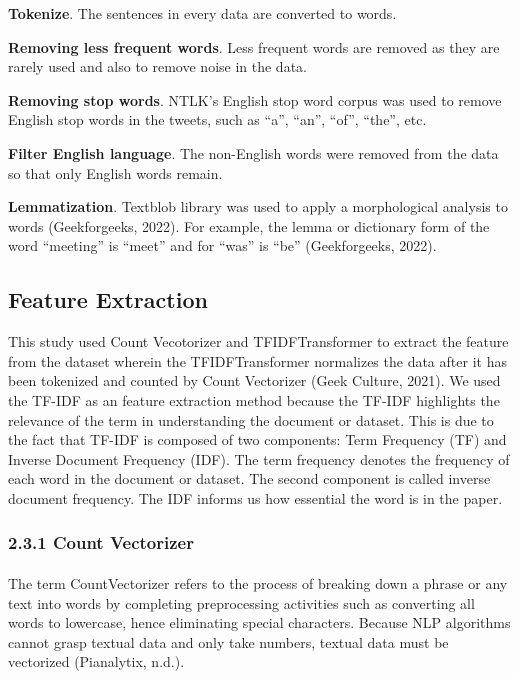 \documentclass[runningheads]{llncs}
\begin{document}
\textbf{Tokenize}. The sentences in every data are converted to words.

\textbf{Removing less frequent words}. Less frequent words are removed as they are rarely used and also to remove noise in the data.

\textbf{Removing stop words}. NTLK’s English stop word corpus was used to remove English stop words in the tweets, such as “a”, “an”, “of”, “the”, etc.

\textbf{Filter English language}. The non-English words were removed from the data so that only English words remain.

\textbf{Lemmatization}. Textblob library was used to apply a morphological analysis to words (Geekforgeeks, 2022). For example, the lemma or dictionary form of the word “meeting” is “meet” and for “was” is “be” (Geekforgeeks, 2022).

\subsection{Feature Extraction}
This study used Count Vecotorizer and TFIDFTransformer to extract the feature from the dataset wherein the TFIDFTransformer normalizes the data after it has been tokenized and counted by Count Vectorizer (Geek Culture, 2021). We used the TF-IDF as an feature extraction method because the TF-IDF highlights the relevance of the term in understanding the document or dataset. This is due to the fact that TF-IDF is composed of two components: Term Frequency (TF) and Inverse Document Frequency (IDF). The term frequency denotes the frequency of each word in the document or dataset. The second component is called inverse document frequency. The IDF informs us how essential the word is in the paper.

\newpage
\subsubsection{2.3.1 Count Vectorizer}
\paragraph{}
The term CountVectorizer refers to the process of breaking down a phrase or any text into words by completing preprocessing activities such as converting all words to lowercase, hence eliminating special characters. Because NLP algorithms cannot grasp textual data and only take numbers, textual data must be vectorized (Pianalytix, n.d.).
\end{document}
